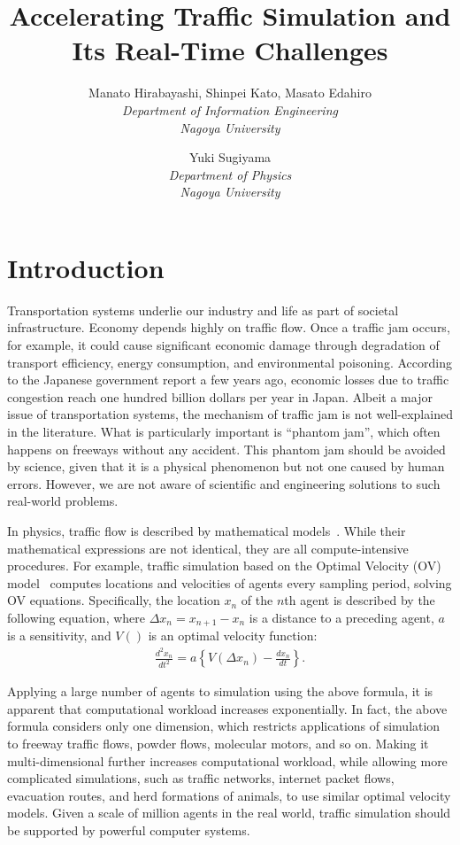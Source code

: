 \documentclass[times, 10pt, twocolumn]{article}
\title{Accelerating Traffic Simulation and Its Real-Time Challenges}
\author {
Manato Hirabayashi, Shinpei Kato, Masato Edahiro\\
\textit{Department of Information Engineering}\\
\textit{Nagoya University}\\
\and
Yuki Sugiyama\\
\textit{Department of Physics}\\
\textit{Nagoya University}\\
}
\begin{document}
\maketitle


\begin{abstract}
\end{abstract}

\section{Introduction}

Transportation systems underlie our industry and life as part of
societal infrastructure.
Economy depends highly on traffic flow.
Once a traffic jam occurs, for example, it could cause significant
economic damage through degradation of transport efficiency, energy
consumption, and environmental poisoning.
According to the Japanese government report a few years ago, economic
losses due to traffic congestion reach one hundred billion dollars per
year in Japan.
Albeit a major issue of transportation systems, the mechanism of traffic
jam is not well-explained in the literature.
What is particularly important is ``phantom jam'', which often happens
on freeways without any accident.
This phantom jam should be avoided by science, given that it is
a physical phenomenon but not one caused by human errors.
However, we are not aware of scientific and engineering solutions to
such real-world problems.

In physics, traffic flow is described by mathematical
models~\cite{Bando1995, Kerner1993, Nagel1992}.
While their mathematical expressions are not identical, they are all
compute-intensive procedures.
For example, traffic simulation based on the Optimal Velocity (OV)
model~\cite{Bando1995} computes locations and velocities of agents every
sampling period, solving OV equations. 
Specifically, the location $x_n$ of the $n$th agent is described by the
following equation, where $\Delta x_n = x_{n+1} - x_n$ is a distance to
a preceding agent, $a$ is a sensitivity, and $V()$ is an optimal
velocity function:
\begin{eqnarray}
 \label{eqn:ov}
 \frac{d^2 x_n}{d t^2} = a \left\{V(\Delta x_n) - \frac{d x_n}{d t}\right\}.
\end{eqnarray}

Applying a large number of agents to simulation using the above formula,
it is apparent that computational workload increases exponentially.
In fact, the above formula considers only one dimension, which restricts
applications of simulation to freeway traffic flows, powder flows,
molecular motors, and so on.
Making it multi-dimensional further increases computational workload,
while allowing more complicated simulations, such as traffic networks,
internet packet flows, evacuation routes, and herd formations of
animals, to use similar optimal velocity models.
Given a scale of million agents in the real world, traffic
simulation should be supported by powerful computer systems.
\end{document}
